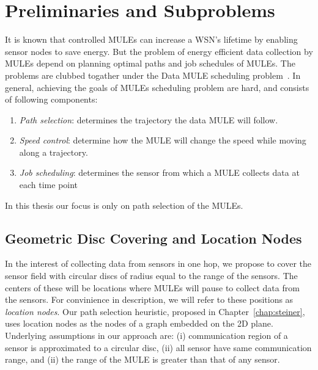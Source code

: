 \chapter{Preliminaries and Subproblems}
\label{chapter:2}


It is known that controlled MULEs can increase a WSN's lifetime by enabling sensor nodes to save energy. But the problem of energy efficient data collection by MULEs depend on planning optimal paths and job schedules of MULEs. The problems are clubbed togather under the Data MULE scheduling problem~\cite{dms}. In general, achieving the goals of MULEs scheduling problem are 
hard, and consists of following components: 
\begin{enumerate}
  \item {\em Path selection}: determines the trajectory the data MULE 
    will follow.
\item {\em Speed control}: determine how the MULE will change the speed
  while moving along a trajectory. 
\item {\em Job scheduling}: determines the sensor from which a MULE collects data at each time point
\end{enumerate}
In this thesis our focus is only on path selection of the MULEs.

\section{Geometric Disc Covering and Location Nodes}

In the interest of collecting data from sensors in one hop, we propose to cover the sensor field with circular discs of radius equal to the range of the sensors. The centers of these will be locations where MULEs will pause to collect data from the sensors. For convinience in description, we will refer to these positions as \emph{location nodes}. Our path selection heuristic, proposed in Chapter~\ref{chap:steiner}, uses location nodes as the nodes of a graph embedded on the 2D plane. Underlying assumptions in our approach are: (i) communication region of a sensor is approximated to a circular disc, (ii) all sensor have same communication range, and (ii) the range of the MULE is greater than that of any sensor. %

